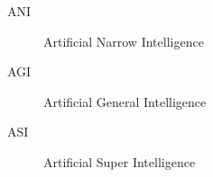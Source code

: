 \begin{description}
    \item[ANI] Artificial Narrow Intelligence 
\end{description}

\begin{description}
    \item[AGI] Artificial General Intelligence 
\end{description}

\begin{description}
    \item[ASI] Artificial Super Intelligence
\end{description}